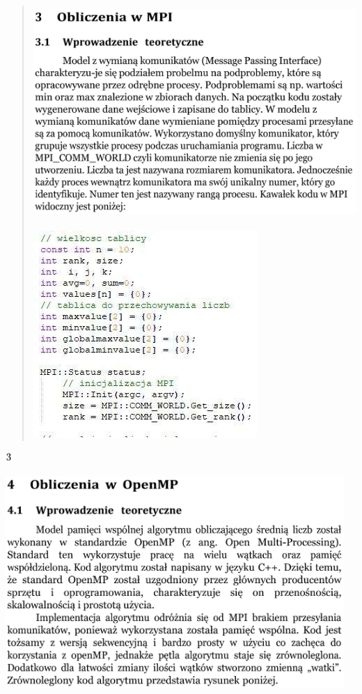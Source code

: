 \documentclass[
]{article}
\begin{document}
\begin{quote}
\includegraphics[width=5in,height=3.16667in]{vertopal_45f5e71363bf454ba37a280ca069ec4b/media/image17.png}

\includegraphics[width=3.35278in,height=3.09861in]{vertopal_45f5e71363bf454ba37a280ca069ec4b/media/image18.png}
\end{quote}

\includegraphics[width=0.13889in,height=0.19444in]{vertopal_45f5e71363bf454ba37a280ca069ec4b/media/image16.png}

\includegraphics[width=5.06944in,height=3.16667in]{vertopal_45f5e71363bf454ba37a280ca069ec4b/media/image19.png}
\end{document}

